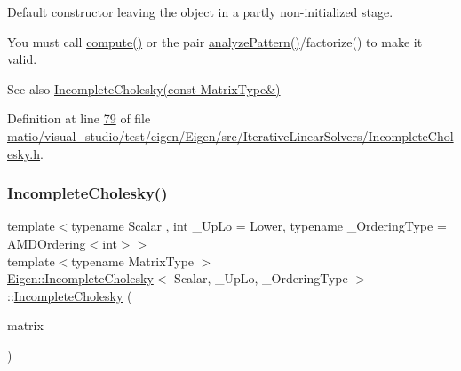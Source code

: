 Default constructor leaving the object in a partly non-\/initialized stage.

You must call \hyperlink{class_eigen_1_1_incomplete_cholesky_a7966bedeebbeaa7a8fe4dd1da3797a0b}{compute()} or the pair \hyperlink{class_eigen_1_1_incomplete_cholesky_a702560ecdddef77dc51d20ab22bd974e}{analyze\+Pattern()}/factorize() to make it valid.

\begin{DoxySeeAlso}{See also}
\hyperlink{class_eigen_1_1_incomplete_cholesky_a757499fc814988a5b112b1f34d0295e1}{Incomplete\+Cholesky(const Matrix\+Type\&)} 
\end{DoxySeeAlso}


Definition at line \hyperlink{matio_2visual__studio_2test_2eigen_2_eigen_2src_2_iterative_linear_solvers_2_incomplete_cholesky_8h_source_l00079}{79} of file \hyperlink{matio_2visual__studio_2test_2eigen_2_eigen_2src_2_iterative_linear_solvers_2_incomplete_cholesky_8h_source}{matio/visual\+\_\+studio/test/eigen/\+Eigen/src/\+Iterative\+Linear\+Solvers/\+Incomplete\+Cholesky.\+h}.

\mbox{\label{class_eigen_1_1_incomplete_cholesky_a757499fc814988a5b112b1f34d0295e1}} 
\subsubsection{\texorpdfstring{Incomplete\+Cholesky()}{IncompleteCholesky()}\hspace{0.1cm}{\footnotesize\ttfamily [4/4]}}
{\footnotesize\ttfamily template$<$typename Scalar , int \+\_\+\+Up\+Lo = Lower, typename \+\_\+\+Ordering\+Type  = A\+M\+D\+Ordering$<$int$>$$>$ \\
template$<$typename Matrix\+Type $>$ \\
\hyperlink{class_eigen_1_1_incomplete_cholesky}{Eigen\+::\+Incomplete\+Cholesky}$<$ Scalar, \+\_\+\+Up\+Lo, \+\_\+\+Ordering\+Type $>$\+::\hyperlink{class_eigen_1_1_incomplete_cholesky}{Incomplete\+Cholesky} (\begin{DoxyParamCaption}\item[{const Matrix\+Type \&}]{matrix }\end{DoxyParamCaption})\hspace{0.3cm}{\ttfamily [inline]}}

